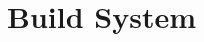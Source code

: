 \documentclass[crop=false]{standalone}
\begin{document}
  \section{Build System} %
  \label{sec:build_system}

\end{document}
